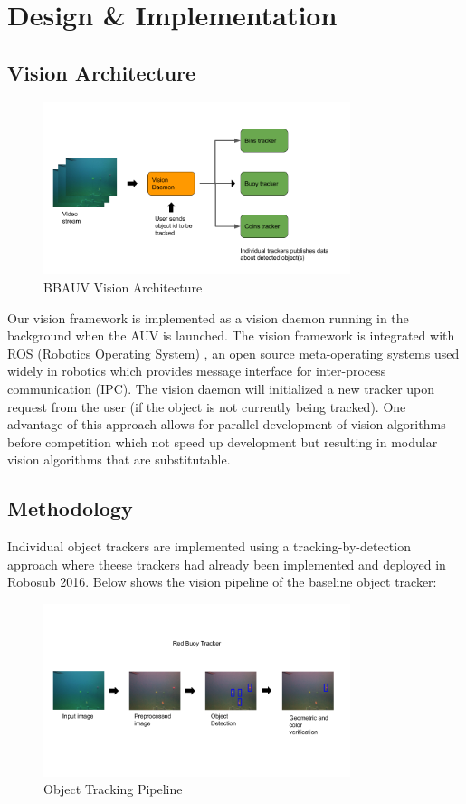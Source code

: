 \documentclass[fypca]{socreport}
\begin{document}
\chapter{Design \& Implementation}
\section{Vision Architecture}
    \begin{figure}[ht]
    \centering
            \includegraphics[width=0.8\textwidth, height=0.3\textheight]{overall_vision_architecture.png}
            \caption{BBAUV Vision Architecture}
            \label{fig:vision_architecture}
    \end{figure}
    
Our vision framework is implemented as a vision daemon running in the background when the AUV is launched. The vision framework is  integrated with ROS (Robotics Operating System) \cite{quigley2009ros}, an open source meta-operating systems used widely in robotics which provides message interface for inter-process communication (IPC). The vision daemon will initialized a new tracker upon request from the user (if the object is not currently being tracked). One advantage of this approach allows for parallel development of vision algorithms before competition which not speed up development but resulting in modular vision algorithms that are substitutable. 
\section{Methodology}
Individual object trackers are implemented using a tracking-by-detection approach where theese trackers had already been implemented and deployed in Robosub 2016. Below shows the vision pipeline of the baseline object tracker:
    \begin{figure}[ht]
    \centering
            \includegraphics[width=0.8\textwidth, height=0.3\textheight]{object_tracking_pipeline.png}
            \caption{Object Tracking Pipeline}
            \label{fig:object_tracking_pipeline}
    \end{figure}
    
\end{document}
